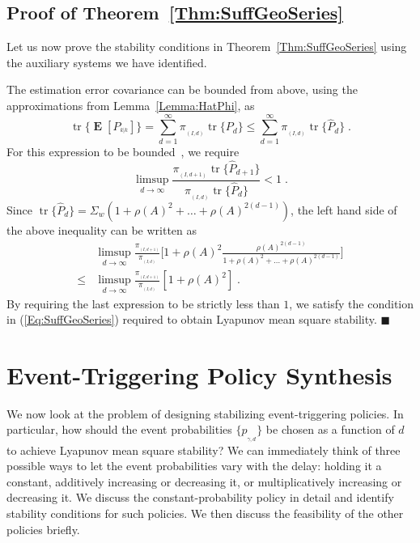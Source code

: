 \documentclass[twocolumn]{autart}
\DeclareMathOperator*{\E}{{\mathbf E}}        \let\Pr\undefined \DeclareMathOperator{\Pr}{{\mathbf P}}        \DeclareMathOperator*{\argmax}{arg\,max}
\DeclareMathOperator{\tr}{tr}
\newenvironment{proof}[1][Proof]{\begin{trivlist}
\item[\hskip \labelsep {\bfseries #1}]}{\end{trivlist}}
\renewcommand{\qed}{$\blacksquare$}
\begin{document}
\subsection{Proof of Theorem~\ref{Thm:SuffGeoSeries}} \label{S:Proof}

Let us now prove the stability conditions in Theorem~\ref{Thm:SuffGeoSeries} using the auxiliary systems we have identified.
\begin{proof}
The estimation error covariance can be bounded from above, using the approximations from Lemma~\ref{Lemma:HatPhi}, as
\begin{equation*}
\tr\{\E[P_{^{k|k}}]\} = \sum_{d=1}^{\infty} \pi_{_{(I,d)}} \tr\{P_d\}
\le \sum_{d=1}^{\infty} \pi_{_{(I,d)}} \tr\{\hat{P}_d\} \; . \end{equation*}
For this expression to be bounded~\cite{Rudin1976}, we require
\begin{equation*}
\limsup_{d \to \infty} \frac{\pi_{_{(I,d+1)}}\tr\{\hat{P}_{d+1}\}}{\pi_{_{(I,d)}}\tr\{\hat{P}_{d}\}} < 1 \; .
\end{equation*}
Since $\tr\{\hat{P}_d\} = \Sigma_w (1+\rho(A)^2+\dots+\rho(A)^{2(d-1)})$, the left hand side of the above inequality can be written as
\begin{align*}
&\limsup_{d \to \infty}  \frac{\pi_{_{(I,d+1)}}}{\pi_{_{(I,d)}}} \bigg[ 1 + \rho(A)^2 \frac{\rho(A)^{2(d-1)}}{1+\rho(A)^2+\dots+\rho(A)^{2(d-1)}} \bigg] \\
\le &\limsup_{d \to \infty} \frac{\pi_{_{(I,d+1)}}}{\pi_{_{(I,d)}}} [ 1 + \rho(A)^2 ] \; .
\end{align*}
By requiring the last expression to be strictly less than $1$, we satisfy the condition  in (\ref{Eq:SuffGeoSeries}) required to obtain Lyapunov mean square stability. \hfill \qed
\end{proof}

\section{Event-Triggering Policy Synthesis} \label{S:SchedDesign}
We now look at the problem of designing stabilizing event-triggering policies. In particular, how should the event probabilities $\{p_{_{\gamma,d}}\}$ be chosen as a function of $d$ to achieve Lyapunov mean square stability? We can immediately think of three possible ways to let the event probabilities vary with the delay: holding it a constant, additively increasing or decreasing it, or multiplicatively increasing or decreasing it. We discuss the constant-probability policy in detail and identify stability conditions for such policies. We then discuss the feasibility of the other policies briefly.
\end{document}
